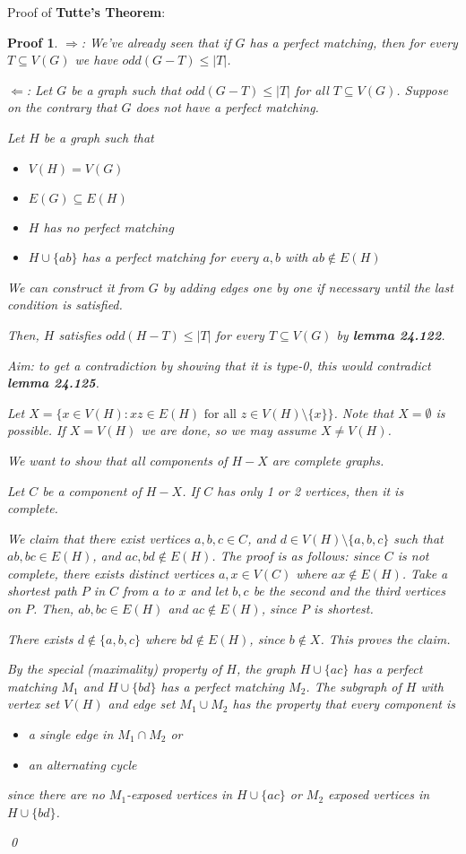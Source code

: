 \documentclass[twoside]{article}
\newtheorem{protoproof}[prototheorem]{Proof}
\renewenvironment{proof}
{\colorlet{shadecolor}{blue!15}\begin{shaded}\begin{protoproof}
		\normalfont}
		{\qed\end{protoproof}\end{shaded}}
\begin{document}
Proof of \textbf{Tutte's Theorem}: 
\begin{proof}
	$\Rightarrow$: We've already seen that if $G$ has a perfect matching, then for every $T \subseteq V(G)$ we have $odd(G - T)  \leq |T|$. 
			
	$\Leftarrow$: Let $G$ be a graph such that $odd(G - T) \leq |T|$ for all $T \subseteq V(G)$. Suppose on the contrary that $G$ does not have a perfect matching. 
			
	Let $H$ be a graph such that \begin{itemize}
	\item $V(H) = V(G)$
	\item $E(G) \subseteq E(H)$
	\item $H$ has no perfect matching
	\item $H \cup \{ab\}$ has a perfect matching for every $a, b$ with $ab \notin E(H)$
	\end{itemize}
	We can construct it from $G$ by adding edges one by one if necessary until the last condition is satisfied. 
		
	Then, $H$ satisfies $odd(H - T) \leq |T|$ for every $T \subseteq V(G)$ by \textbf{lemma 24.122}. 
		
	Aim: to get a contradiction by showing that it is type-0, this would contradict \textbf{lemma 24.125}.
		
	Let $X = \{x \in V(H) : xz \in E(H) \text{ for all } z \in V(H) \setminus \{x\}\}$. Note that $X = \emptyset$ is possible. If $X = V(H)$ we are done, so we may assume $X \neq V(H)$. 
		
	We want to show that all components of $H - X$ are complete graphs. 
		
	Let $C$ be a component of $H - X$. If $C$ has only 1 or 2 vertices, then it is complete. 
		
	We claim that there exist vertices $a, b, c \in C$, and $d \in V(H) \setminus \{a, b, c\}$ such that $ab, bc \in E(H)$, and $ac, bd \notin E(H)$. The proof is as follows: since $C$ is not complete, there exists distinct vertices $a, x \in V(C)$ where $ax \notin E(H)$. Take a shortest path $P$ in $C$ from $a$ to $x$ and let $b, c$ be the second and the third vertices on $P$. Then, $ab, bc \in E(H)$ and $ac \notin E(H)$, since $P$ is shortest. 
		
	There exists  $d \notin \{a, b, c\}$ where $bd \notin E(H)$, since $b \notin X$. This proves the claim. 
		
	By the special (maximality) property of $H$, the graph $H \cup \{ac\}$ has a perfect matching $M_1$ and $H \cup \{bd\}$ has a perfect matching $M_2$. The subgraph of $H$ with vertex set $V(H)$ and edge set $M_1 \cup M_2$ has the property that every component is \begin{itemize}
	\item a single edge in $M_1 \cap M_2$ or
	\item an alternating cycle
	\end{itemize}
	since there are no $M_1$-exposed vertices in $H \cup \{ac\}$ or $M_2$ exposed vertices in $H \cup \{bd\}$. 
		

\end{proof}
\end{document}
